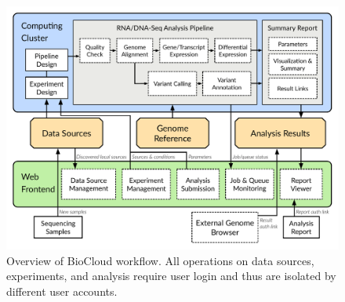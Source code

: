 \begin{figure}[!htbp]
\centering
\includegraphics[width=1\textwidth]{images/overview_workflow}
\caption[Overview of BioCloud website workflow]{
    Overview of BioCloud workflow. All operations on data sources, experiments,
    and analysis require user login and thus are isolated by different user
    accounts.
}
\label{fig:overview-workflow}
\end{figure}
